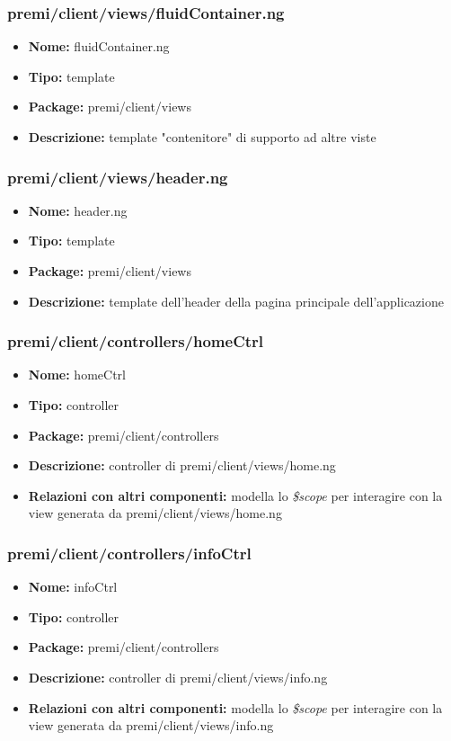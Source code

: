   
\subsubsection{premi/client/views/fluidContainer.ng}
\begin{itemize}
  \item[] \textbf{Nome:} fluidContainer.ng
  \item[] \textbf{Tipo:} template
  \item[] \textbf{Package:} premi/client/views
  \item[] \textbf{Descrizione:} template "contenitore" di supporto ad altre viste
\end{itemize}

\subsubsection{premi/client/views/header.ng}
\begin{itemize}
  \item[] \textbf{Nome:} header.ng
  \item[] \textbf{Tipo:} template
  \item[] \textbf{Package:} premi/client/views
  \item[] \textbf{Descrizione:} template dell'header della pagina principale dell'applicazione
\end{itemize}

\subsubsection{premi/client/controllers/homeCtrl}
\begin{itemize}
  \item[] \textbf{Nome:} homeCtrl
  \item[] \textbf{Tipo:} controller
  \item[] \textbf{Package:} premi/client/controllers
  \item[] \textbf{Descrizione:} controller di premi/client/views/home.ng
   \item[] \textbf{Relazioni con altri componenti:} modella lo \textit{\$scope} per interagire con la view generata da premi/client/views/home.ng
\end{itemize}


\subsubsection{premi/client/controllers/infoCtrl}
\begin{itemize}
  \item[] \textbf{Nome:} infoCtrl
  \item[] \textbf{Tipo:} controller
  \item[] \textbf{Package:} premi/client/controllers
  \item[] \textbf{Descrizione:} controller di premi/client/views/info.ng
  \item[] \textbf{Relazioni con altri componenti:} modella lo \textit{\$scope} per interagire con la view generata da premi/client/views/info.ng 
\end{itemize}

